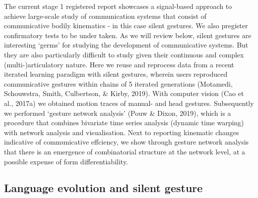 \documentclass[
  man, noextraspace,floatsintext]{apa6}
\begin{document}
The current stage 1 registered report showcases a signal-based approach to achieve large-scale study of communication systems that consist of communicative bodily kinematics - in this case silent gestures. We also pregister confirmatory tests to be under taken. As we will review below, silent gestures are interesting `germs' for studying the development of communicative systems. But they are also particularly difficult to study given their continuous and complex (multi-)articulatory nature. Here we reuse and reprocess data from a recent iterated learning paradigm with silent gestures, wherein users reproduced communicative gestures within chains of 5 iterated generations (Motamedi, Schouwstra, Smith, Culbertson, \& Kirby, 2019). With computer vision (Cao et al., 2017a) we obtained motion traces of manual- and head gestures. Subsequently we performed `gesture network analysis' (Pouw \& Dixon, 2019), which is a procedure that combines bivariate time series analysis (dynamic time warping) with network analysis and visualisation. Next to reporting kinematic changes indicative of communicative effciency, we show through gesture network analysis that there is an emergence of combinatorial structure at the network level, at a possible expense of form differentiability.

\hypertarget{language-evolution-and-silent-gesture}{%
\subsection{Language evolution and silent gesture}\label{language-evolution-and-silent-gesture}}
\end{document}
